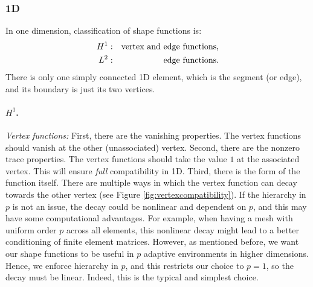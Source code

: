 
\subsubsection{1D}

In one dimension, classification of shape functions is:
\begin{align*}
  H^1:&\quad\text{vertex and edge functions,}\\
  L^2:&\quad\text{\phantom{vertex and} edge functions.}
\end{align*}
There is only one simply connected 1D element, which is the segment (or edge), and its boundary is just its two vertices.

\paragraph{$H^1$.}
\textit{Vertex functions:} %
First, there are the vanishing properties.
The vertex functions should vanish at the other (unassociated) vertex.
Second, there are the nonzero trace properties.
The vertex functions should take the value $1$ at the associated vertex.
This will ensure \textit{full} compatibility in 1D.
Third, there is the form of the function itself.
There are multiple ways in which the vertex function can decay towards the other vertex (see Figure \ref{fig:vertexcompatibility}).
If the hierarchy in $p$ is not an issue, the decay could be nonlinear and dependent on $p$, and this may have some computational advantages.
For example, when having a mesh with uniform order $p$ across all elements, this nonlinear decay might lead to a better conditioning of finite element matrices.
However, as mentioned before, we want our shape functions to be useful in $p$ adaptive environments in higher dimensions.
Hence, we enforce hierarchy in $p$, and this restricts our choice to $p=1$, so the decay must be linear.
Indeed, this is the typical and simplest choice.

